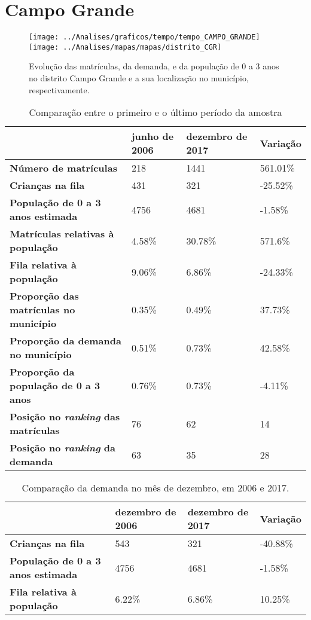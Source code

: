 \section{Campo Grande}
\begin{figure}[H]
\centering
\texttt{[image: ../Analises/graficos/tempo/tempo\_CAMPO\_GRANDE]}
\texttt{[image: ../Analises/mapas/mapas/distrito\_CGR]}
\caption{Evolução das matrículas, da demanda, e da população de 0 a 3 anos no distrito Campo Grande e a sua localização no município, respectivamente.}
\end{figure}
\begin{table}[H]
\begin{tabular}{l|l|l|l}
\textbf{}                                      & \textbf{junho de 2006}       & \textbf{dezembro de 2017}    & \textbf{Variação} \\ \hline
\textbf{Número de matrículas}                  & 218 & 1441 & 561.01\% \\ \hline
\textbf{Crianças na fila}                      & 431 & 321 & -25.52\% \\ \hline
\textbf{População de 0 a 3 anos estimada}      & 4756 & 4681 & -1.58\% \\ \hline
\textbf{Matrículas relativas à população}      & 4.58\% & 30.78\% & 571.6\% \\ \hline
\textbf{Fila relativa à população}             & 9.06\% & 6.86\% & -24.33\% \\ \hline
\textbf{Proporção das matrículas no município} & 0.35\% & 0.49\% & 37.73\% \\ \hline
\textbf{Proporção da demanda no município}     & 0.51\% & 0.73\% & 42.58\% \\ \hline
\textbf{Proporção da população de 0 a 3 anos}  & 0.76\% & 0.73\% & -4.11\% \\ \hline
\textbf{Posição no \textit{ranking} das matrículas}     & 76 & 62 & 14 \\ \hline
\textbf{Posição no \textit{ranking} da demanda}         & 63 & 35 & 28 \\ 
\end{tabular}
\caption{Comparação entre o primeiro e o último período da amostra}
\end{table}
\begin{table}[H]
\begin{tabular}{l|l|l|l}
\textbf{}                                 & \textbf{dezembro de 2006} & \textbf{dezembro de 2017} & \textbf{Variação} \\ \hline
\textbf{Crianças na fila}                      & 543 & 321 & -40.88\% \\ \hline
\textbf{População de 0 a 3 anos estimada}      & 4756 & 4681 & -1.58\% \\ \hline
\textbf{Fila relativa à população}             & 6.22\% & 6.86\% & 10.25\% \\
\end{tabular}
\caption{Comparação da demanda no mês de dezembro, em 2006 e 2017.}
\end{table}
